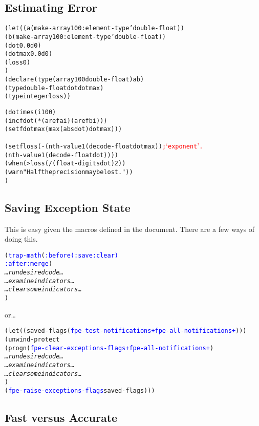 \documentclass[10pt,fleqn]{article}
\newcommand{\codelia}[1]{\textcolor{blue}{#1}}
\begin{document}
\subsection{Estimating Error}

\begin{alltt}
    (let ((a (make-array 100 :element-type 'double-float))
          (b (make-array 100 :element-type 'double-float))
          (dot 0.0d0)
          (dotmax 0.0d0)
          (loss 0)
         )
      (declare (type (array 100 double-float) a b)
               (type double-float dot dotmax)
               (type integer loss))
     
      (dotimes (i 100)
         (incf dot (* (aref a i) (aref b i)))
         (setf dotmax (max (abs dot) dotmax)))

      (setf loss (- (nth-value 1 (decode-float dotmax)) \textcolor{red}{; `exponent'.}
                    (nth-value 1 (decode-float dot))))
      (when (> loss (/ (float-digits dot) 2))
         (warn "Half the precision may be lost."))
      )
\end{alltt}


\subsection{Saving Exception State}

This is easy given the macros defined in the document.  There are a
few ways of doing this.

\begin{alltt}
    (\codelia{trap-math} (\codelia{:before (:save :clear)}
                \codelia{:after :merge})
       \textit{\ldots run desired code \ldots}
       \textit{\ldots examine indicators \ldots}
       \textit{\ldots clear some indicators \ldots}
       )
\end{alltt}
or\ldots
\begin{alltt}
    (let ((saved-flags (\codelia{fpe-test-notifications +fpe-all-notifications+})))
       (unwind-protect
           (progn (\codelia{fpe-clear-exceptions-flags +fpe-all-notifications+})
                  \textit{\ldots run desired code \ldots}
                  \textit{\ldots examine indicators \ldots}
                  \textit{\ldots clear some indicators \ldots}
                  )
         (\codelia{fpe-raise-exceptions-flags} saved-flags)))
\end{alltt}


\subsection{Fast versus Accurate}
\end{document}

